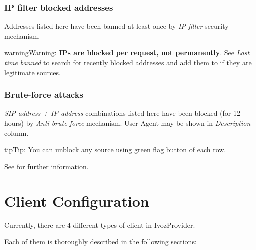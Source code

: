 \documentclass[letterpaper,10pt,english]{sphinxmanual}
\begin{document}
\subsection{IP filter blocked addresses}
\label{administration_portal/brand/views/ipfilter_blocked_addresses:ip-filter-blocked-addresses}\label{administration_portal/brand/views/ipfilter_blocked_addresses::doc}\label{administration_portal/brand/views/ipfilter_blocked_addresses:id1}
Addresses listed here have been banned at least once by \emph{IP filter} security mechanism.

\begin{notice}{warning}{Warning:}
\textbf{IPs are blocked per request, not permanently}. See \emph{Last time banned} to search for recently blocked
addresses and add them to {\hyperref[security_and_maintenance/security/authorized_ip_ranges:authorized\string-ip\string-ranges]{}} if they are legitimate sources.
\end{notice}


\subsection{Brute-force attacks}
\label{administration_portal/brand/views/bruteforce_attacks::doc}\label{administration_portal/brand/views/bruteforce_attacks:brute-force-attacks}\label{administration_portal/brand/views/bruteforce_attacks:id1}
\emph{SIP address + IP address} combinations listed here have been blocked (for 12 hours) by \emph{Anti brute-force} mechanism.
User-Agent may be shown in \emph{Description} column.

\begin{notice}{tip}{Tip:}
You can unblock any source using green flag button of each row.
\end{notice}

See {\hyperref[security_and_maintenance/security/antibruteforce:anti\string-brute\string-force\string-attacks]{}} for further information.


\chapter{Client Configuration}
\label{administration_portal/client/index:client-configuration}\label{administration_portal/client/index::doc}
Currently, there are 4 different types of client in IvozProvider.

Each of them is thoroughly described in the following sections:
\label{administration_portal/client/vpbx/index:vpbx-clients}
\end{document}
